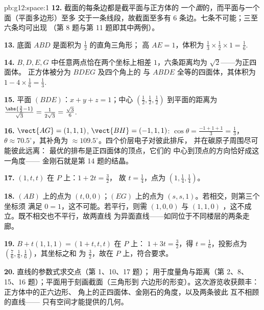 \begin{solution}{pb:g12:space:1}
\textbf{12.} 截面的每条边都是截平面与正方体的
一个\emph{面}的，而平面与一个面（平面多边形）至多
交于一条线段，故截面至多有
$6$ 条边。七条不可能；三至六条均可出现
（第 8 题与第 11 题即其中两例）。

\textbf{13.} 底面 $ABD$ 是面积为 $\frac12$ 的直角三角形；
高 $AE = 1$，体积为
$\frac13 \times \frac12 \times 1 = \frac16$.

\textbf{14.} $B, D, E, G$ 中任意两点恰在两个坐标上相差
$1$，六条距离均为 $\sqrt2$——为正四面体。
正方体被分为 $BDEG$ 及四个角上的
与 $ABDE$ 全等的四面体，其体积为
$1 - 4 \times \frac16 = \frac13$.

\textbf{15.} 平面 $(BDE)$：$x + y + z = 1$；中心
$\left(\frac12,\frac12,\frac12\right)$ 到平面的距离为
$\frac{\abs{\frac32 - 1}}{\sqrt3} = \frac{1}{2\sqrt3} =
\frac{\sqrt3}{6}$.

\textbf{16.} $\vect{AG} = (1,1,1)$,
$\vect{BH} = (-1,1,1)$: $\cos\theta = \frac{-1 + 1 + 1}{3} =
\frac13$，$\theta \approx 70.5^\circ$，其补角为
$\approx 109.5^\circ$。四个价层电子对彼此排斥，
并在碳原子周围尽可能彼此远离：
最优的排布是正四面体的顶点，它们的
中心到顶点的方向恰好成这一角度——
金刚石就是第 14 题的结晶。

\textbf{17.} $(1, t, t)$ 在 $P$ 上：$1 + 2t = \frac32$，
故 $t = \frac14$，点为 $\left(1, \frac14, \frac14\right)$。

\textbf{18.} $(AB)$ 上的点为 $(t, 0, 0)$；$(EG)$ 上的点为
$(s, s, 1)$。若相交，则第三个坐标须
满足 $0 = 1$，这不可能。若平行，则需 $(1,0,0)$ 与
$(1,1,0)$ ，这不成立。既不相交也不平行，故两直线
为异面直线——如同位于不同楼层的两条走廊。

\textbf{19.} $B + t(1,1,1) = (1 + t, t, t)$ 在 $P$ 上：
$1 + 3t = \frac32$，得 $t = \frac16$，投影点为
$\left(\frac76, \frac16, \frac16\right)$，其坐标之和
为 $\frac32$，故在 $P$ 上，符合要求。

\textbf{20.} 直线的参数式求交点（第 1、10、17 题）；
用于度量角与距离（第 2、8、
15、16 题）；平面用于刻画截面（三角形到
六边形的形变）。这次游览收获颇丰：正方体中的正六边形、
角上的正四面体、金刚石的角度，以及两条彼此
互不相顾的直线——
只有空间才能提供的几何。
\end{solution}
